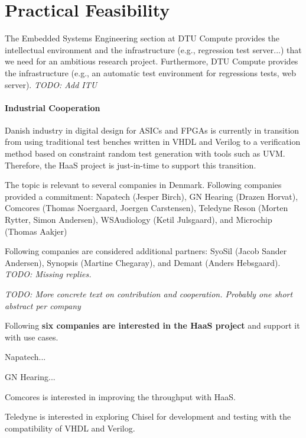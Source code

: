 \documentclass[fleqn,12pt]{article}
\newcommand{\todo}[1]{{\it TODO: #1}}
\begin{document}
\section{Practical Feasibility}

The Embedded Systems Engineering section at DTU Compute provides
the intellectual environment and the infrastructure (e.g., regression test server...) that we need for an ambitious research project.
Furthermore, DTU Compute provides the infrastructure (e.g., an automatic test
environment for regressions tests, web server).
\todo{Add ITU}

%



\paragraph*{Industrial Cooperation}

Danish industry in digital design for ASICs and FPGAs is currently in transition from using traditional
test benches written in VHDL and Verilog to a verification method based on constraint random
test generation with tools such as UVM. Therefore, the HaaS project is just-in-time to support this
transition.

The topic is relevant to several companies in Denmark. Following companies provided a commitment: Napatech (Jesper Birch), GN Hearing (Drazen Horvat), Comcores (Thomas Noergaard, Joergen Carstensen), Teledyne Reson (Morten Rytter, Simon Andersen), WSAudiology (Ketil Julsgaard), and Microchip (Thomas Aakjer)


Following companies are considered additional partners: SyoSil (Jacob Sander Andersen), Synopsis (Martine Chegaray), and Demant (Anders Hebsgaard).
\todo{Missing replies.}

\todo{More concrete text on contribution and cooperation. Probably one short abstract per company}

Following {\bf six companies are interested in the HaaS project} and support it with use cases.

Napatech...

GN Hearing...

Comcores is interested in improving the throughput with HaaS.

Teledyne is interested in exploring Chisel for development and testing with the compatibility of VHDL and Verilog.
\end{document}
